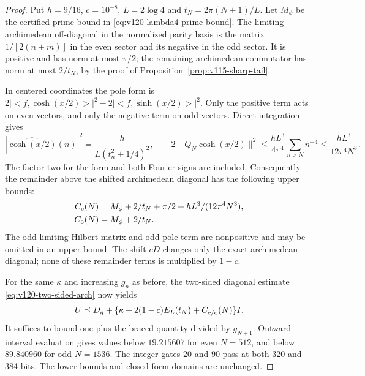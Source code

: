 \documentclass[11pt]{article}
\def\ip#1#2{<#1,#2>}%
\theoremstyle{remark}
\newcommand{\ip}[2]{\left\langle #1,#2\right\rangle}
\begin{document}
\begin{proof}
Put $h=9/16$, $c=10^{-8}$, $L=2\log4$ and
$t_N=2\pi(N+1)/L$. Let $M_\phi$ be the certified prime bound
in \eqref{eq:v120-lambda4-prime-bound}. The limiting archimedean
off-diagonal in the normalized parity basis is the matrix
$1/[2(n+m)]$ in the even sector and its negative in the odd sector.
It is positive and has norm at most $\pi/2$; the remaining
archimedean commutator has norm at most $2/t_N$, by the proof of
Proposition~\ref{prop:v115-sharp-tail}.

In centered coordinates the pole form is
$2|\ip f{\cosh(x/2)}|^2-2|\ip f{\sinh(x/2)}|^2$.
Only the positive term acts on even vectors, and only the negative
term on odd vectors. Direct integration gives
\[
 |\widehat{\cosh(x/2)}(n)|^2
 =\frac{h}{L(t_n^2+1/4)^2},\qquad
 2\|Q_N\cosh(x/2)\|^2
 \le\frac{hL^3}{4\pi^4}\sum_{n>N}n^{-4}
 \le\frac{hL^3}{12\pi^4N^3}.
\]
The factor two for the form and both Fourier signs are included.
Consequently the remainder above the shifted archimedean diagonal
has the following upper bounds:
\begin{equation}\label{eq:v122-parity-upper}
 \begin{split}
 C_{\rm e}(N)&=M_\phi+2/t_N+\pi/2+hL^3/(12\pi^4N^3),\\
 C_{\rm o}(N)&=M_\phi+2/t_N.
 \end{split}
\end{equation}
The odd limiting Hilbert matrix and odd pole term are nonpositive
and may be omitted in an upper bound. The shift $cD$ changes only
the exact archimedean diagonal; none of these remainder terms is
multiplied by $1-c$.

For the same $\kappa$ and increasing $g_n$ as before, the two-sided
diagonal estimate \eqref{eq:v120-two-sided-arch} now yields
\[
 U\preceq D_g+
 \{\kappa+2(1-c)E_L(t_N)+C_{\rm e/o}(N)\}I.
\]
It suffices to bound one plus the braced quantity divided by
$g_{N+1}$. Outward interval evaluation gives values below
$19.215607$ for even $N=512$, and below $89.840960$ for odd
$N=1536$. The integer gates $20$ and $90$ pass at both 320 and
384 bits. The lower bounds and closed form domains are unchanged.
\end{proof}
\end{document}
